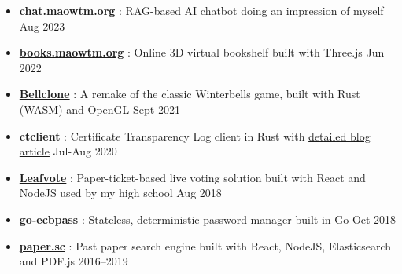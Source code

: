   \begin{itemize}
    \item \href{https://chat.maowtm.org}{\textbf{\color{link}chat.maowtm.org}} : RAG-based AI chatbot doing an impression of myself \dashdiv{} Aug 2023

    \item \href{https://books.maowtm.org}{\textbf{\color{link}books.maowtm.org}} : Online 3D virtual bookshelf built with Three.js \dashdiv{} Jun 2022

    \item \href{https://bellclone.maowtm.org/}{\color{link}\textbf{Bellclone}} : A remake of the classic Winterbells game, built with Rust (WASM) and OpenGL \dashdiv{} Sept 2021

    \item \textbf{ctclient} : Certificate Transparency Log client in Rust with \href{https://blog.maowtm.org/ct/en.html}{\color{link}detailed blog article} \dashdiv{} Jul-Aug 2020

    \item \href{https://leafvote.mww.moe}{\color{link}\textbf{Leafvote}} : Paper-ticket-based live voting solution built with React and NodeJS used by my high school \dashdiv{} Aug 2018

    \item \textbf{go-ecbpass} : Stateless, deterministic password manager built in Go \dashdiv{} Oct 2018

    \item \href{https://paper.sc}{\color{link}\textbf{paper.sc}} : Past paper search engine built with React, NodeJS, Elasticsearch and PDF.js \dashdiv{} 2016--2019
  \end{itemize}


